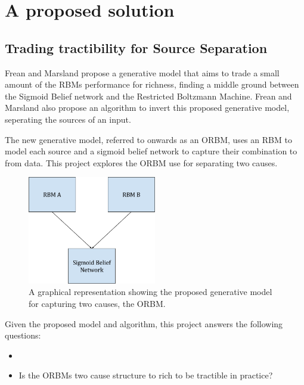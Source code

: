 \section{A proposed solution}
\subsection{Trading tractibility for Source Separation}
Frean and Marsland propose a generative model that aims to trade a small amount of the RBMs performance for richness, finding a middle ground between the Sigmoid Belief network and the Restricted Boltzmann Machine.
Frean and Marsland also propose an algorithm to invert this proposed generative model, seperating the sources of an input.

The new generative model, referred to onwards as an ORBM, uses an RBM to model each source and a sigmoid belief network to capture their combination to from data. This project explores the ORBM use for separating two causes.

\begin{figure}[h]
\begin{center}
  \includegraphics[width = 0.5\textwidth]{Assets/ORBM_fig_1}
\caption{A graphical representation showing the proposed generative model for capturing two causes, the ORBM.}

\label{F:ORBM-fig-1}
\end{center}
\end{figure}

Given the proposed model and algorithm, this project answers the following questions:
\begin{itemize}
  \item {}
  \item Is the ORBMs two cause structure to rich to be tractible in practice?
\end{itemize}

